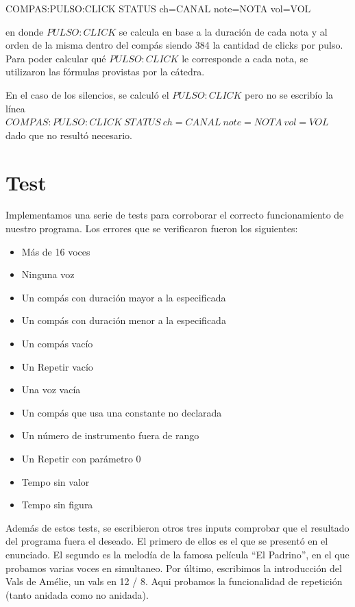 \documentclass[a4paper, 10pt, twoside]{article}
\begin{document}
\begin{center} 
COMPAS:PULSO:CLICK STATUS ch=CANAL note=NOTA vol=VOL
\end{center}

en donde $PULSO:CLICK$ se calcula en base a la duración de cada nota y al orden de la misma dentro del compás siendo 384 la cantidad de clicks por pulso. Para poder calcular qué $PULSO:CLICK$ le corresponde a cada nota, se utilizaron las fórmulas provistas por la cátedra.

En el caso de los silencios, se calculó el $PULSO:CLICK$ pero no se escribío la línea $COMPAS:PULSO:CLICK\ STATUS\ ch=CANAL\ note=NOTA\ vol=VOL$ dado que no resultó necesario.


\section{Test}
Implementamos una serie de tests para corroborar el correcto funcionamiento de nuestro programa. Los errores que se verificaron fueron los siguientes:

\begin{itemize}
\item Más de 16 voces
\item Ninguna voz
\item Un compás con duración mayor a la especificada
\item Un compás con duración menor a la especificada
\item Un compás vacío 
\item Un Repetir vacío
\item Una voz vacía 
\item Un compás que usa una constante no declarada
\item Un número de instrumento fuera de rango
\item Un Repetir con parámetro 0
\item Tempo sin valor
\item Tempo sin figura
\end{itemize}

Además de estos tests, se escribieron otros tres inputs comprobar que el resultado del programa fuera el deseado. El primero de ellos es el que se presentó en el enunciado. El segundo es la melodía de la famosa película ``El Padrino'', en el que probamos varias voces en simultaneo. Por último, escribimos la introducción del Vals de Amélie, un vals en 12 / 8. Aqui probamos la funcionalidad de repetición (tanto anidada como no anidada).
\end{document}
